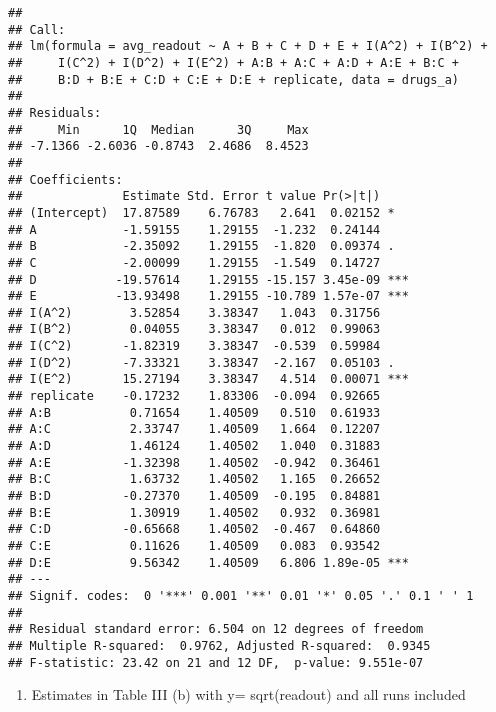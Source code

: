 \documentclass[
]{article}
\providecommand{\tightlist}{%
  \setlength{\itemsep}{0pt}\setlength{\parskip}{0pt}}
\begin{document}
\begin{verbatim}
## 
## Call:
## lm(formula = avg_readout ~ A + B + C + D + E + I(A^2) + I(B^2) + 
##     I(C^2) + I(D^2) + I(E^2) + A:B + A:C + A:D + A:E + B:C + 
##     B:D + B:E + C:D + C:E + D:E + replicate, data = drugs_a)
## 
## Residuals:
##     Min      1Q  Median      3Q     Max 
## -7.1366 -2.6036 -0.8743  2.4686  8.4523 
## 
## Coefficients:
##              Estimate Std. Error t value Pr(>|t|)    
## (Intercept)  17.87589    6.76783   2.641  0.02152 *  
## A            -1.59155    1.29155  -1.232  0.24144    
## B            -2.35092    1.29155  -1.820  0.09374 .  
## C            -2.00099    1.29155  -1.549  0.14727    
## D           -19.57614    1.29155 -15.157 3.45e-09 ***
## E           -13.93498    1.29155 -10.789 1.57e-07 ***
## I(A^2)        3.52854    3.38347   1.043  0.31756    
## I(B^2)        0.04055    3.38347   0.012  0.99063    
## I(C^2)       -1.82319    3.38347  -0.539  0.59984    
## I(D^2)       -7.33321    3.38347  -2.167  0.05103 .  
## I(E^2)       15.27194    3.38347   4.514  0.00071 ***
## replicate    -0.17232    1.83306  -0.094  0.92665    
## A:B           0.71654    1.40509   0.510  0.61933    
## A:C           2.33747    1.40509   1.664  0.12207    
## A:D           1.46124    1.40502   1.040  0.31883    
## A:E          -1.32398    1.40502  -0.942  0.36461    
## B:C           1.63732    1.40502   1.165  0.26652    
## B:D          -0.27370    1.40509  -0.195  0.84881    
## B:E           1.30919    1.40502   0.932  0.36981    
## C:D          -0.65668    1.40502  -0.467  0.64860    
## C:E           0.11626    1.40509   0.083  0.93542    
## D:E           9.56342    1.40509   6.806 1.89e-05 ***
## ---
## Signif. codes:  0 '***' 0.001 '**' 0.01 '*' 0.05 '.' 0.1 ' ' 1
## 
## Residual standard error: 6.504 on 12 degrees of freedom
## Multiple R-squared:  0.9762, Adjusted R-squared:  0.9345 
## F-statistic: 23.42 on 21 and 12 DF,  p-value: 9.551e-07
\end{verbatim}

\begin{enumerate}
\def\labelenumi{\Roman{enumi}.}
\setcounter{enumi}{1}
\tightlist
\item
  Estimates in Table III (b) with y= sqrt(readout) and all runs included
\end{enumerate}
\end{document}
